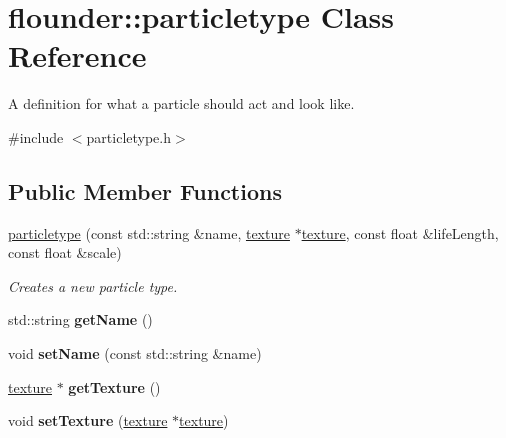 \hypertarget{classflounder_1_1particletype}{}\section{flounder\+:\+:particletype Class Reference}
\label{classflounder_1_1particletype}


A definition for what a particle should act and look like.  




{\ttfamily \#include $<$particletype.\+h$>$}

\subsection*{Public Member Functions}
\begin{DoxyCompactItemize}
\item 
\hyperlink{classflounder_1_1particletype_a5b67bec1305e49290ee3d7d4a318512d}{particletype} (const std\+::string \&name, \hyperlink{classflounder_1_1texture}{texture} $\ast$\hyperlink{classflounder_1_1texture}{texture}, const float \&life\+Length, const float \&scale)
\begin{DoxyCompactList}\small\item\em Creates a new particle type. \end{DoxyCompactList}\item 
\mbox{\label{classflounder_1_1particletype_a3da53a4e7930d68b56a2971ddbaaa4df}} 
std\+::string {\bfseries get\+Name} ()
\item 
\mbox{\label{classflounder_1_1particletype_adaa2977206f302133d7a1f7e1cc947e1}} 
void {\bfseries set\+Name} (const std\+::string \&name)
\item 
\mbox{\label{classflounder_1_1particletype_a074fd73b5c052fdc57c42f94947ca900}} 
\hyperlink{classflounder_1_1texture}{texture} $\ast$ {\bfseries get\+Texture} ()
\item 
\mbox{\label{classflounder_1_1particletype_af3a1e043573e2bc0bcdfa863b6871e03}} 
void {\bfseries set\+Texture} (\hyperlink{classflounder_1_1texture}{texture} $\ast$\hyperlink{classflounder_1_1texture}{texture})
\item 
\mbox{\label{classflounder_1_1particletype_a29688bf18f9dae4e8a2ef99a0a0c9478}} 

\end{DoxyCompactItemize}
